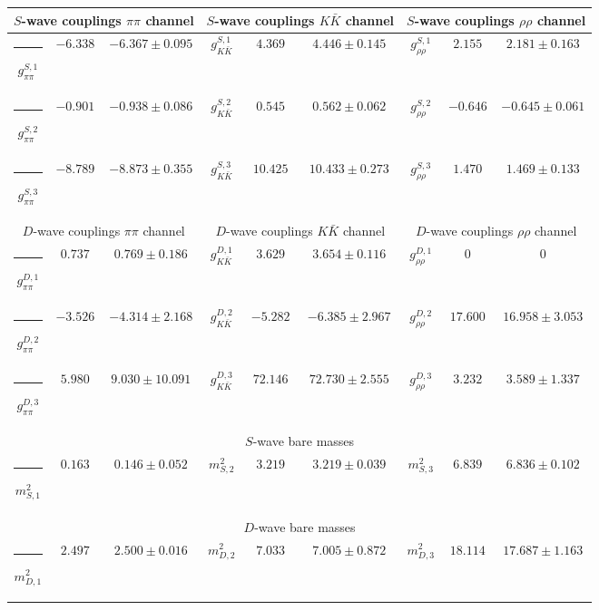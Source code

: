 \begin{table}[h]
\begin{ruledtabular}
\begin{tabular}{c c c c c c c c c}
\multicolumn{3}{c}{$S$-wave couplings $\pi \pi$ channel}  & \multicolumn{3}{c}{$S$-wave couplings $K  \bar K$ channel} & \multicolumn{3}{c}{$S$-wave couplings $\rho\rho$ channel} \\ \hline
\rule[-0.2cm]{-0.1cm}{.55cm} $g^{S,1}_{\pi\pi}$ & $-6.338$ & $-6.367 \pm 0.095$ & $g^{S,1}_{K\bar K}$ & $4.369$ & $4.446 \pm 0.145$ & $g^{S,1}_{\rho\rho}$ & $2.155$ & $2.181 \pm 0.163$ \\
\rule[-0.2cm]{-0.1cm}{.55cm} $g^{S,2}_{\pi\pi}$ & $-0.901$ & $-0.938 \pm 0.086$ & $g^{S,2}_{K\bar K}$ & $0.545$ & $0.562 \pm 0.062$ & $g^{S,2}_{\rho\rho}$ & $-0.646$ & $-0.645 \pm 0.061$ \\
\rule[-0.2cm]{-0.1cm}{.55cm} $g^{S,3}_{\pi\pi}$ & $-8.789$ & $-8.873 \pm 0.355$ & $g^{S,3}_{K\bar K}$ & $10.425$ & $10.433 \pm 0.273$ & $g^{S,3}_{\rho\rho}$ & $1.470$ & $1.469 \pm 0.133$ \\
\hline 
\multicolumn{3}{c}{$D$-wave couplings $\pi \pi$ channel}  & \multicolumn{3}{c}{$D$-wave couplings $K  \bar K$ channel} & \multicolumn{3}{c}{$D$-wave couplings $\rho\rho$ channel} \\ \hline
\rule[-0.2cm]{-0.1cm}{.55cm} $g^{D,1}_{\pi\pi}$ & $0.737$ & $0.769 \pm 0.186$ & $g^{D,1}_{K\bar K}$ & $3.629$ & $3.654 \pm 0.116$ & $g^{D,1}_{\rho\rho}$ & $0$ & $0$ \\
\rule[-0.2cm]{-0.1cm}{.55cm} $g^{D,2}_{\pi\pi}$ & $-3.526$ & $-4.314 \pm 2.168$ & $g^{D,2}_{K\bar K}$ & $-5.282$ & $-6.385 \pm 2.967$ & $g^{D,2}_{\rho\rho}$ & $17.600$ & $16.958 \pm 3.053$ \\
\rule[-0.2cm]{-0.1cm}{.55cm} $g^{D,3}_{\pi\pi}$ & $5.980$ & $9.030 \pm 10.091$ & $g^{D,3}_{K\bar K}$ & $72.146$ & $72.730 \pm 2.555$ & $g^{D,3}_{\rho\rho}$ & $3.232$ & $3.589 \pm 1.337$ \\
\hline 
\multicolumn{9}{c}{$S$-wave bare masses}   \\ \hline
\rule[-0.2cm]{-0.1cm}{.55cm} $m^2_{S,1}$ & $0.163$ & $0.146 \pm 0.052$ & $m^2_{S,2}$ & $3.219$ & $3.219 \pm 0.039$ & $m^2_{S,3}$ & $6.839$ & $6.836 \pm 0.102$ \\
\hline 
\multicolumn{9}{c}{$D$-wave bare masses}   \\ \hline
\rule[-0.2cm]{-0.1cm}{.55cm} $m^2_{D,1}$ & $2.497$ & $2.500 \pm 0.016$ & $m^2_{D,2}$ & $7.033$ & $7.005 \pm 0.872$ & $m^2_{D,3}$ & $18.114$ & $17.687 \pm 1.163$ \\

\end{tabular}
\end{ruledtabular}
\end{table}
